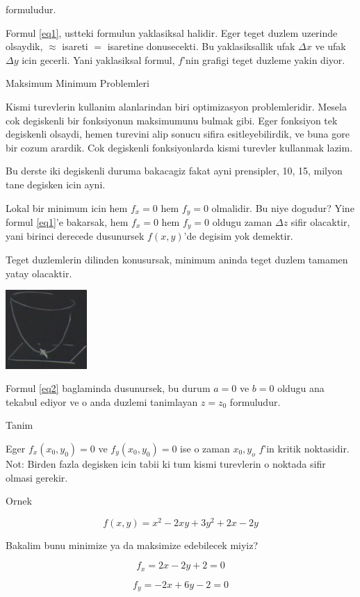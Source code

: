 \documentclass[12pt,fleqn]{article}
\begin{document}
formuludur. 

Formul \ref{eq1}, ustteki formulun yaklasiksal halidir. Eger teget duzlem
uzerinde olsaydik, $\approx$ isareti $=$ isaretine donusecekti. Bu
yaklasiksallik ufak $\Delta x$ ve ufak $\Delta y$ icin gecerli. Yani
yaklasiksal formul, $f$'nin grafigi teget duzleme yakin diyor. 

Maksimum Minimum Problemleri 

Kismi turevlerin kullanim alanlarindan biri optimizasyon
problemleridir. Mesela cok degiskenli bir fonksiyonun maksimumunu bulmak
gibi. Eger fonksiyon tek degiskenli olsaydi, hemen turevini alip sonucu
sifira esitleyebilirdik, ve buna gore bir cozum arardik. Cok degiskenli
fonksiyonlarda kismi turevler kullanmak lazim. 

Bu derste iki degiskenli duruma bakacagiz fakat ayni prensipler, 10, 15,
milyon tane degisken icin ayni. 

Lokal bir minimum icin hem $f_x=0$ hem $f_y=0$ olmalidir. Bu niye
dogudur? Yine formul \ref{eq1}'e bakarsak, hem $f_x=0$ hem $f_y=0$ oldugu
zaman $\Delta z$ sifir olacaktir, yani birinci derecede dusunursek
$f(x,y)$'de degisim yok demektir. 

Teget duzlemlerin dilinden konusursak, minimum aninda teget duzlem tamamen
yatay olacaktir. 

\includegraphics[height=3cm]{9_3.png}

Formul \ref{eq2} baglaminda dusunursek, bu durum $a=0$ ve $b=0$ oldugu ana
tekabul ediyor ve o anda duzlemi tanimlayan $z = z_0$ formuludur. 

Tanim

Eger $f_x(x_0,y_0)= 0$ ve $f_y(x_0,y_0)= 0$ ise o zaman $x_0,y_o$ $f$'in
kritik noktasidir. Not: Birden fazla degisken icin tabii ki tum kismi
turevlerin o noktada sifir olmasi gerekir.

Ornek

\[ f(x,y) = x^2 - 2xy + 3y^2 + 2x - 2y \]

Bakalim bunu minimize ya da maksimize edebilecek miyiz? 

\[ f_x = 2x - 2y + 2 = 0\]

\[ f_y = -2x + 6y - 2 = 0 \]
\end{document}
